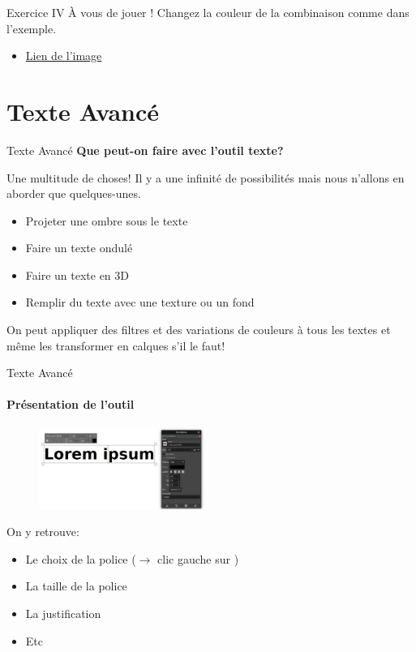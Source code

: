 \documentclass[10pt,svgnames,usenames,table]{beamer}
\newlength\myheight
\newlength\mydepth
\newcommand*\inlinegraphics[1]{%
  \settototalheight\myheight{Xygp}%
  \settodepth\mydepth{Xygp}%
  \raisebox{-\mydepth}{\texttt{[image: \#1]}}%
}
\begin{document}
	\begin{frame}{Exercice IV}
		À vous de jouer ! Changez la couleur de la combinaison comme dans l'exemple.
		\begin{itemize}
			\item \href{http://louvainlinux.github.io/atelier-gimp/src/Images/colours/col5.jpg}{Lien de l'image}
		\end{itemize}
	\end{frame}




\section{Texte Avancé}
	\begin{frame}{Texte Avancé}
		\textbf{Que peut-on faire avec l'outil texte?}	

		Une multitude de choses! Il y a une infinité de possibilités mais nous n'allons en aborder que quelques-unes.
		\begin{itemize}
			\item Projeter une ombre sous le texte
			\item Faire un texte ondulé
			\item Faire un texte en 3D
			\item Remplir du texte avec une texture ou un fond
		\end{itemize}
	
		On peut appliquer des filtres et des variations de couleurs à tous les textes et même les transformer en calques s'il le faut!
	\end{frame}

\begin{frame}{Texte Avancé}
	\framesubtitle{Présentation de l'outil}
	\begin{figure}
		\centering
		\includegraphics[height=100px]{Images/text/text}
	\end{figure}
	On y retrouve:
	\begin{itemize}
	\item Le choix de la police ($\rightarrow$ clic gauche sur  \inlinegraphics{Images/text/font} )
	\item La taille de la police
	\item La justification
	\item Etc
	\end{itemize}
\end{frame}
\end{document}
